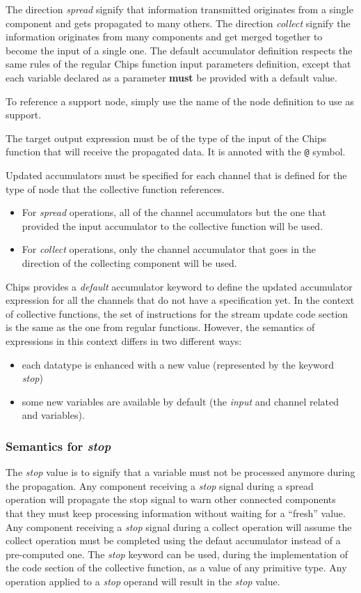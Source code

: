 \documentclass{article}
\begin{document}
The direction \emph{spread} signify that information transmitted originates from a single component and gets propagated to many others. The direction \emph{collect} signify the information originates from many components and get merged together to become the input of a single one.
The default accumulator definition respects the same rules of the regular Chips function input parameters definition, except that each variable declared as a parameter \textbf{must} be provided with a default value.

To reference a support node, simply use the name of the node definition to use as support.

The target output expression must be of the type of the input of the Chips function that will receive the propagated data. It is annoted with the \texttt{@} symbol.

Updated accumulators must be specified for each channel that is defined for the type of node that the collective function references.
\begin{itemize}
    \item For \emph{spread} operations, all of the channel accumulators but the one that provided the input accumulator to the collective function will be used.
    \item For \emph{collect} operations, only the channel accumulator that goes in the direction of the collecting component will be used.
\end{itemize}

Chips provides a \emph{default} accumulator keyword to define the updated accumulator expression for all the channels that do not have a specification yet.
In the context of collective functions, the set of instructions for the stream update code section is the same as the one from regular functions. However, the semantics of expressions in this context differs in two different ways:
\begin{itemize}
    \item each datatype is enhanced with a new value (represented by the keyword \emph{stop})
    \item some new variables are available by default (the \emph{input} and channel related and variables).
\end{itemize}

\subsubsection{Semantics for \emph{stop}}
The \emph{stop} value is to signify that a variable must not be processed anymore during the propagation. Any component receiving a \emph{stop} signal during a spread operation will propagate the stop signal to warn other connected components that they must keep processing information without waiting for a ``fresh'' value. Any component receiving a \emph{stop} signal during a collect operation will assume the collect operation must be completed using the defaut accumulator instead of a pre-computed one.
The \emph{stop} keyword can be used, during the implementation of the code section of the collective function, as a value of any primitive type. Any operation applied to a \emph{stop} operand will result in the \emph{stop} value.
\end{document}
